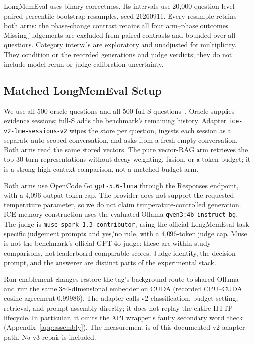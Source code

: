 \documentclass[11pt,a4paper]{article}
\begin{document}
LongMemEval uses binary correctness. Its intervals use 20,000 question-level paired percentile-bootstrap resamples, seed 20260911. Every resample retains both arms; the phase-change contrast retains all four arm--phase outcomes. Missing judgements are excluded from paired contrasts and bounded over all questions. Category intervals are exploratory and unadjusted for multiplicity. They condition on the recorded generations and judge verdicts; they do not include model rerun or judge-calibration uncertainty.

\subsection{Matched LongMemEval Setup}
\label{sec:lme-setup}
We use all 500 oracle questions and all 500 full-S questions~\citep{wu2025longmemeval}. Oracle supplies evidence sessions; full-S adds the benchmark's remaining history. Adapter \texttt{ice-v2-lme-sessions-v2} wipes the store per question, ingests each session as a separate auto-scoped conversation, and asks from a fresh empty conversation. Both arms read the same stored vectors. The pure vector-RAG arm retrieves the top 30 turn representations without decay weighting, fusion, or a token budget; it is a strong high-context comparison, not a matched-budget arm.

Both arms use OpenCode Go \texttt{gpt-5.6-luna} through the Responses endpoint, with a 4,096-output-token cap. The provider does not support the requested temperature parameter, so we do not claim temperature-controlled generation. ICE memory construction uses the evaluated Ollama \texttt{qwen3:4b-instruct-bg}. The judge is \texttt{muse-spark-1.3-contributor}, using the official LongMemEval task-specific judgement prompts and yes/no rule, with a 4,096-token judge cap. Muse is not the benchmark's official GPT-4o judge: these are within-study comparisons, not leaderboard-comparable scores. Judge identity, the decision prompt, and the answerer are distinct parts of the experimental stack.

Run-enablement changes restore the tag's background route to shared Ollama and run the same 384-dimensional embedder on CUDA (recorded CPU--CUDA cosine agreement 0.99986). The adapter calls v2 classification, budget setting, retrieval, and prompt assembly directly; it does not replay the entire HTTP lifecycle. In particular, it omits the API wrapper's faulty secondary word check (Appendix~\ref{app:assembly}). The measurement is of this documented v2 adapter path. No v3 repair is included.
\end{document}
